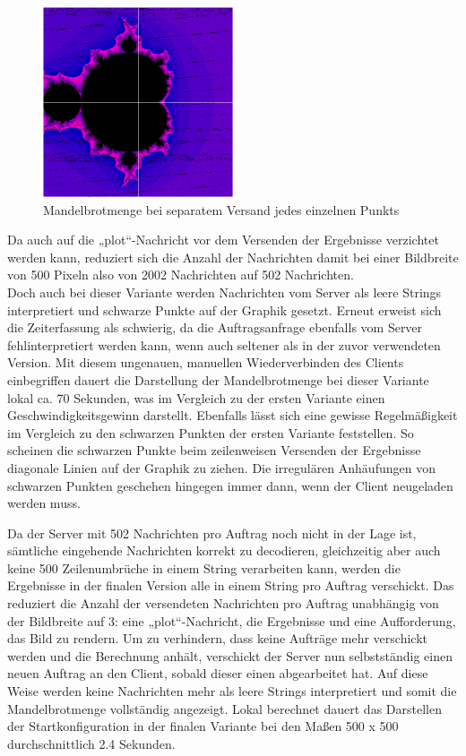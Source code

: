 \documentclass[12pt, onecolumn, notitlepage]{scrartcl}
\begin{document}
\begin{figure}[htbp] 
	\centering
	\includegraphics[width=0.5\textwidth]{zeilenVersandt.PNG}
	\caption{Mandelbrotmenge bei separatem Versand jedes einzelnen Punkts}
	\label{fig:Bild2}
\end{figure}

Da auch auf die „plot“-Nachricht vor dem Versenden der Ergebnisse verzichtet werden kann, reduziert sich die Anzahl der Nachrichten damit bei einer Bildbreite von 500 Pixeln also von 2002 Nachrichten auf 502 Nachrichten.\\
Doch auch bei dieser Variante werden Nachrichten vom Server als leere Strings interpretiert und schwarze Punkte auf der Graphik gesetzt. Erneut erweist sich die Zeiterfassung als schwierig, da die Auftragsanfrage ebenfalls vom Server fehlinterpretiert werden kann, wenn auch seltener als in der zuvor verwendeten Version. Mit diesem ungenauen, manuellen Wiederverbinden des Clients einbegriffen dauert die Darstellung der Mandelbrotmenge bei dieser Variante lokal ca. 70 Sekunden, was im Vergleich zu der ersten Variante einen Geschwindigkeitsgewinn darstellt. Ebenfalls lässt sich eine gewisse Regelmäßigkeit im Vergleich zu den schwarzen Punkten der ersten Variante feststellen. So scheinen die schwarzen Punkte beim zeilenweisen Versenden der Ergebnisse  diagonale Linien auf der Graphik zu ziehen. Die irregulären Anhäufungen von schwarzen Punkten geschehen hingegen immer dann, wenn der Client neugeladen werden muss. \par
Da der Server mit 502 Nachrichten pro Auftrag noch nicht in der Lage ist, sämtliche eingehende Nachrichten korrekt zu decodieren, gleichzeitig aber auch keine 500 Zeilenumbrüche in einem String verarbeiten kann, werden die Ergebnisse in der finalen Version alle in einem String pro Auftrag verschickt. Das reduziert die Anzahl der versendeten Nachrichten pro Auftrag unabhängig von der Bildbreite auf 3: eine „plot“-Nachricht, die Ergebnisse und eine Aufforderung, das Bild zu rendern. Um zu verhindern, dass keine Aufträge mehr verschickt werden und die Berechnung anhält, verschickt der Server nun selbstständig einen neuen Auftrag an den Client, sobald dieser einen abgearbeitet hat. Auf diese Weise werden keine Nachrichten mehr als leere Strings interpretiert und somit die Mandelbrotmenge vollständig angezeigt. Lokal berechnet dauert das Darstellen der Startkonfiguration in der finalen Variante bei den Maßen 500 x 500 durchschnittlich 2.4 Sekunden.\par
\end{document}
